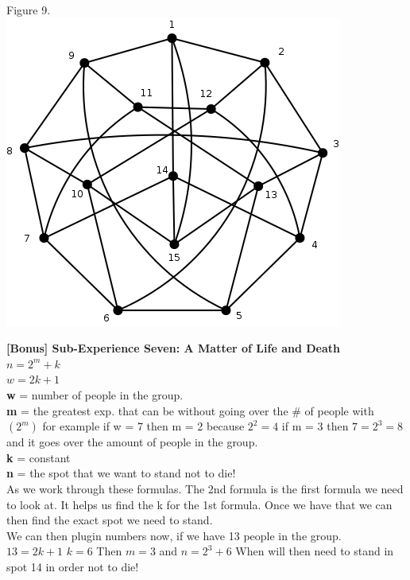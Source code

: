 \documentclass[10pt,a4paper]{report}
\begin{document}
		\begin{center}
			Figure 9.\\
			\includegraphics[scale=.5]{e6.png}
			\newline
			\newline
		\end{center}
	\textbf{[Bonus] Sub-Experience Seven: A Matter of Life and Death}\\	
		$n = 2^m + k$\\
		$w = 2k + 1$\\
		\textbf{w} = number of people in the group.\\
		\textbf{m} = the greatest exp. that can be without going over the \# of people with $(2^m)$ for example if w = 7 then m = 2 because $2^2 = 4$ if m = 3 then $7 = 2^3 = 8$ and it goes over the amount of people in the group.\\
		\textbf{k} = constant\\
		\textbf{n} = the spot that we want to stand not to die!\\
		\newline
		As we work through these formulas.  The 2nd formula is the first formula we need to look at.  It helps us find the k for the 1st formula.  Once we have that we can then find the exact spot we need to stand.\\
		\newline
		We can then plugin numbers now, if we have 13 people in the group.\\
		$13 = 2k + 1$ $k = 6$  Then $m = 3$ and $n = 2^3 + 6$ When will then need to stand in spot 14 in order not to die!
		\begin{center}

		\end{center}
\end{document}
